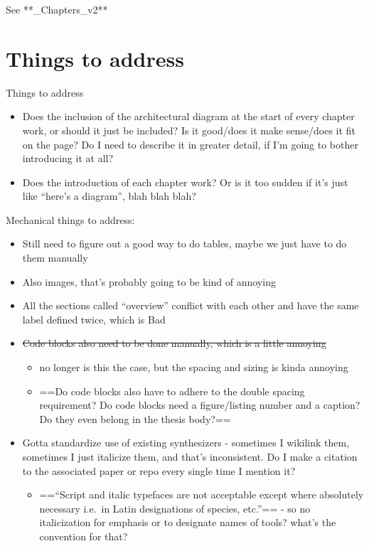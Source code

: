See **\_Chapters\_v2**

\section{Things to address}\label{things-to-address}

Things to address

\begin{itemize}
\tightlist
\item
  Does the inclusion of the architectural diagram at the start of every
  chapter work, or should it just be included? Is it good/does it make
  sense/does it fit on the page? Do I need to describe it in greater
  detail, if I'm going to bother introducing it at all?
\item
  Does the introduction of each chapter work? Or is it too sudden if
  it's just like ``here's a diagram'', blah blah blah?
\end{itemize}

Mechanical things to address:

\begin{itemize}
\tightlist
\item
  Still need to figure out a good way to do tables, maybe we just have
  to do them manually
\item
  Also images, that's probably going to be kind of annoying
\item
  All the sections called ``overview'' conflict with each other and have
  the same label defined twice, which is Bad
\item
  \st{Code blocks also need to be done manually, which is a little
  annoying}

  \begin{itemize}
  \tightlist
  \item
    no longer is this the case, but the spacing and sizing is kinda
    annoying
  \item
    ==Do code blocks also have to adhere to the double spacing
    requirement? Do code blocks need a figure/listing number and a
    caption? Do they even belong in the thesis body?==
  \end{itemize}
\item
  Gotta standardize use of existing synthesizers - sometimes I wikilink
  them, sometimes I just italicize them, and that's inconsistent. Do I
  make a citation to the associated paper or repo every single time I
  mention it?

  \begin{itemize}
  \tightlist
  \item
    ==``Script and italic typefaces are not acceptable except where
    absolutely necessary i.e.~in Latin designations of species, etc.''==
    - so no italicization for emphasis or to designate names of tools?
    what's the convention for that?
  \end{itemize}
\end{itemize}

